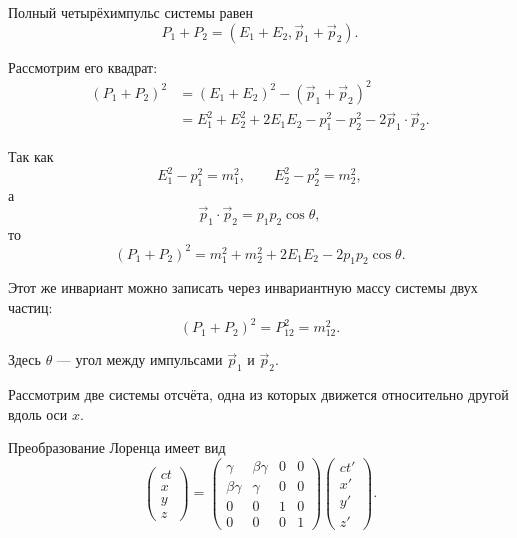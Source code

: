\documentclass[../final.tex]{subfiles}
\begin{document}
Полный четырёхимпульс системы равен
%
\begin{equation*}
    P_1+P_2
    =
    (E_1+E_2,\vec p_1+\vec p_2).
\end{equation*}

Рассмотрим его квадрат:
%
\begin{align*}
    (P_1+P_2)^2
    &=
    (E_1+E_2)^2
    -
    (\vec p_1+\vec p_2)^2
    \\[3pt]
    &=
    E_1^2
    +
    E_2^2
    +
    2E_1E_2
    -
    p_1^2
    -
    p_2^2
    -
    2\vec p_1\cdot\vec p_2.
\end{align*}

Так как
%
\begin{equation*}
    E_1^2-p_1^2=m_1^2,
    \qquad
    E_2^2-p_2^2=m_2^2,
\end{equation*}
%
а
%
\begin{equation*}
    \vec p_1\cdot\vec p_2
    =
    p_1p_2\cos\theta,
\end{equation*}
%
то
%
\begin{equation*}
    (P_1+P_2)^2
    =
    m_1^2+m_2^2
    +
    2E_1E_2
    -
    2p_1p_2\cos\theta.
\end{equation*}

Этот же инвариант можно записать через инвариантную массу системы
двух частиц:
%
\begin{equation*}
    (P_1+P_2)^2
    =
    P_{12}^2
    =
    m_{12}^2.
\end{equation*}

Здесь $\theta$ --- угол между импульсами $\vec p_1$ и $\vec p_2$.




Рассмотрим две системы отсчёта, одна из которых движется относительно
другой вдоль оси $x$.

Преобразование Лоренца имеет вид
%
\begin{equation*}
    \begin{pmatrix}
        ct\\
        x\\
        y\\
        z
    \end{pmatrix}
    =
    \begin{pmatrix}
        \gamma      & \beta\gamma & 0 & 0\\
        \beta\gamma & \gamma      & 0 & 0\\
        0           & 0           & 1 & 0\\
        0           & 0           & 0 & 1
    \end{pmatrix}
    \begin{pmatrix}
        ct'\\
        x'\\
        y'\\
        z'
    \end{pmatrix}.
\end{equation*}
\end{document}

